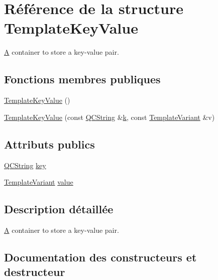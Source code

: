 \hypertarget{struct_template_key_value}{}\section{Référence de la structure Template\+Key\+Value}
\label{struct_template_key_value}


\hyperlink{class_a}{A} container to store a key-\/value pair.  


\subsection*{Fonctions membres publiques}
\begin{DoxyCompactItemize}
\item 
\hyperlink{struct_template_key_value_a87866297022dff72c34b687b0404136f}{Template\+Key\+Value} ()
\item 
\hyperlink{struct_template_key_value_a0d7b8fd0d50a39b79d91b20aa9637d5e}{Template\+Key\+Value} (const \hyperlink{class_q_c_string}{Q\+C\+String} \&\hyperlink{060__command__switch_8tcl_a20363f854eb4098a446733d63d34dbc1}{k}, const \hyperlink{class_template_variant}{Template\+Variant} \&v)
\end{DoxyCompactItemize}
\subsection*{Attributs publics}
\begin{DoxyCompactItemize}
\item 
\hyperlink{class_q_c_string}{Q\+C\+String} \hyperlink{struct_template_key_value_a0ddc1f84556f7fe45971a16393a9e193}{key}
\item 
\hyperlink{class_template_variant}{Template\+Variant} \hyperlink{struct_template_key_value_aafe9623dcfaab1220ff3e6e65fe4cdde}{value}
\end{DoxyCompactItemize}


\subsection{Description détaillée}
\hyperlink{class_a}{A} container to store a key-\/value pair. 

\subsection{Documentation des constructeurs et destructeur}
\hypertarget{struct_template_key_value_a87866297022dff72c34b687b0404136f}{}
